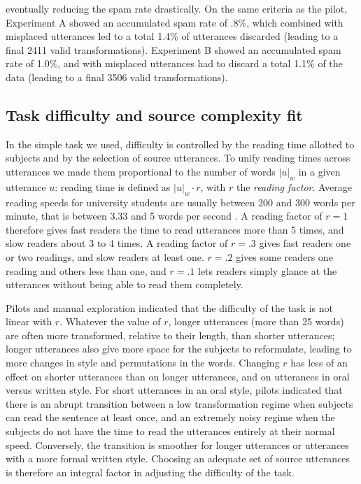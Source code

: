 \documentclass[a4paper,fleqn]{cas-dc}
\begin{document}
eventually reducing the spam rate drastically. On the same criteria as
the pilot, Experiment A showed an accumulated spam rate of .8\%,
which combined with misplaced utterances led to a total 1.4\% of
utterances discarded (leading to a final 2411 valid transformations).
Experiment B showed an accumulated spam rate of 1.0\%, and with
misplaced utterances had to discard a total 1.1\% of the data (leading
to a final 3506 valid transformations).

%
\subsection{Task difficulty and source complexity
fit}\label{task-difficulty-and-source-complexity-fit}

In the simple task we used, difficulty is controlled by the reading time
allotted to subjects and by the selection of source utterances. To unify reading times
 across utterances we made them proportional to the number of words \(|u|_w\) in a given utterance \(u\):
reading time is defined as \(|u|_w \cdot r\), with \(r\) the
\emph{reading factor}. Average reading speeds for university students
are usually between 200 and 300 words per minute, that is between 3.33
and 5 words per second \citep%
{rayner_eye_2010}. A reading factor of \(r = 1\) therefore gives fast readers the time to read
utterances more than 5 times, and slow readers about 3 to 4 times. A
reading factor of \(r = .3\) gives fast readers one or two readings, and
slow readers at least one. \(r = .2\) gives some readers one reading and
others less than one, and \(r = .1\) lets readers simply glance at the
utterances without being able to read them completely.

Pilots and manual exploration indicated that the difficulty of the task
is not linear with \(r\). Whatever the value of \(r\), longer utterances
(more than 25 words) are often more transformed, relative to their
length, than shorter utterances; longer utterances also give more space
for the subjects to reformulate, leading to more changes in style and
permutations in the words. Changing \(r\) has less of an effect on shorter
utterances than on longer utterances, and on utterances in oral versus
written style. For short utterances in an oral style, pilots indicated
that there is an abrupt transition between a low transformation regime
when subjects can read the sentence at least once, and an extremely
noisy regime when the subjects do not have the time to read the
utterances entirely at their normal speed. Conversely, the transition is
smoother for longer utterances or utterances with a more formal written
style. Choosing an adequate set of source utterances is therefore an
integral factor in adjusting the difficulty of the task.
\end{document}
